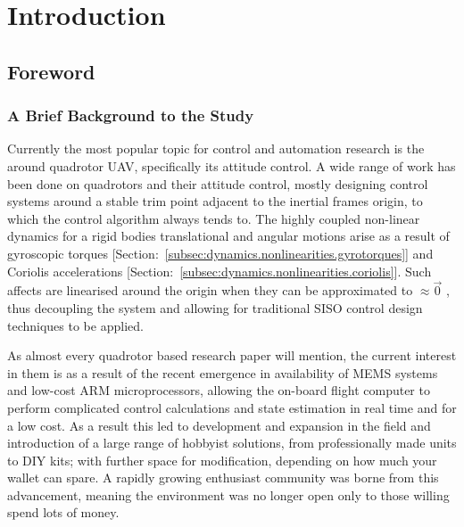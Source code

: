 \chapter{Introduction}
\label{ch:intro}
\section{Foreword}
\label{sec:intro.foreword}
\subsection{A Brief Background to the Study}
\label{subsec:intro.foreword.background}
Currently the most popular topic for control and automation research is the around quadrotor UAV, specifically its attitude control. A wide range of work has been done on quadrotors and their attitude control, mostly designing control systems around a stable trim point adjacent to the inertial frames origin, to which the control algorithm always tends to. The highly coupled non-linear dynamics for a rigid bodies translational and angular motions arise as a result of gyroscopic torques [Section:~\ref{subsec:dynamics.nonlinearities.gyrotorques}] and Coriolis accelerations [Section:~\ref{subsec:dynamics.nonlinearities.coriolis}]. Such affects are linearised around the origin when they can be approximated to $\approx \vec{0}$ , thus decoupling the system and allowing for traditional SISO control design techniques to be applied.
\par
As almost every quadrotor based research paper will mention, the current interest in them is as a result of the recent emergence in availability of MEMS systems and low-cost ARM microprocessors, allowing the on-board flight computer to perform complicated control calculations and state estimation in real time and for a low cost. As a result this led to development and expansion in the field and introduction of a large range of hobbyist solutions, from professionally made units to DIY kits; with further space for modification, depending on how much your wallet can spare. A rapidly growing enthusiast community was borne from this advancement, meaning the environment was no longer open only to those willing spend lots of money.
\par
